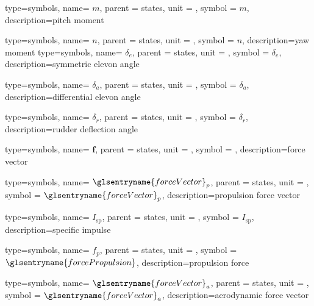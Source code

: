 {type=symbols,
  name= \ensuremath{m},
  parent = {states},
  unit = \unexpanded{\si{\newton\meter}},
  symbol = \ensuremath{m},
  description={pitch moment}
}

{type=symbols,
  name= \ensuremath{n},
  parent = {states},
  unit = \unexpanded{\si{\newton\meter}},
  symbol = \ensuremath{n},
  description={yaw moment}
}
{type=symbols,
  name= \ensuremath{\delta_{e}},
  parent = {states},
  unit = \unexpanded{\si{\degree}},
  symbol = \ensuremath{\delta_{e}},
  description={symmetric elevon angle}
}

{type=symbols,
  name= \ensuremath{\delta_{a}},
  parent = {states},
  unit = \unexpanded{\si{\degree}},
  symbol = \ensuremath{\delta_{a}},
  description={differential elevon angle}
}

{type=symbols,
  name= \ensuremath{\delta_{r}},
  parent = {states},
  unit = \unexpanded{\si{\degree}},
  symbol = \ensuremath{\delta_{r}},
  description={rudder deflection angle}
}

{type=symbols,
  name= \ensuremath{\mathbf{f}},
  parent = {states},
  unit = \unexpanded{\si{\newton}},
  symbol = ,
  description={force vector}
}

{type=symbols,
  name= \ensuremath{{\glsentryname{forceVector}}_{p}},
  parent = {states},
  unit = \unexpanded{\si{\newton}},
  symbol = \ensuremath{{\glsentryname{forceVector}}_{p}},
  description={propulsion force vector}
}

{type=symbols,
  name= \ensuremath{I_\textrm{sp}},
  parent = {states},
  unit = \unexpanded{\si{\second}},
  symbol = \ensuremath{I_\textrm{sp}},
  description={specific impulse}
}


{type=symbols,
  name= \ensuremath{f_{p}},
  parent = {states},
  unit = \unexpanded{\si{\newton}},
  symbol = \ensuremath{\glsentryname{forcePropulsion}},
  description={propulsion force}
}


{type=symbols,
  name= \ensuremath{{\glsentryname{forceVector}}_{a}},
  parent = {states},
  unit = \unexpanded{},
  symbol = \ensuremath{{\glsentryname{forceVector}}_{a}},
  description={aerodynamic force vector}
}

